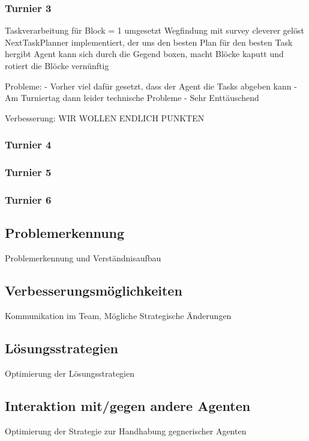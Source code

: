 \subsubsection{Turnier 3}
Taskverarbeitung für Block = 1 umgesetzt \newline
Wegfindung mit survey cleverer gelöst \newline
NextTaskPlanner implementiert, der uns den besten Plan für den besten Task hergibt \newline
Agent kann sich durch die Gegend boxen, macht Blöcke kaputt und rotiert die Blöcke vernünftig \newline

Probleme: 
- Vorher viel dafür gesetzt, dass der Agent die Tasks abgeben kann \newline
- Am Turniertag dann leider technische Probleme \newline
- Sehr Enttäuschend \newline

Verbesserung: WIR WOLLEN ENDLICH PUNKTEN

\subsubsection{Turnier 4}
\subsubsection{Turnier 5}
\subsubsection{Turnier 6}

\subsection{Problemerkennung}
Problemerkennung und Verständnisaufbau

\subsection{Verbesserungsmöglichkeiten}
Kommunikation im Team, Mögliche Strategische Änderungen

\subsection{Lösungsstrategien}
Optimierung der Lösungsstrategien

\subsection{Interaktion mit/gegen andere Agenten}
Optimierung der Strategie zur Handhabung gegnerischer Agenten
